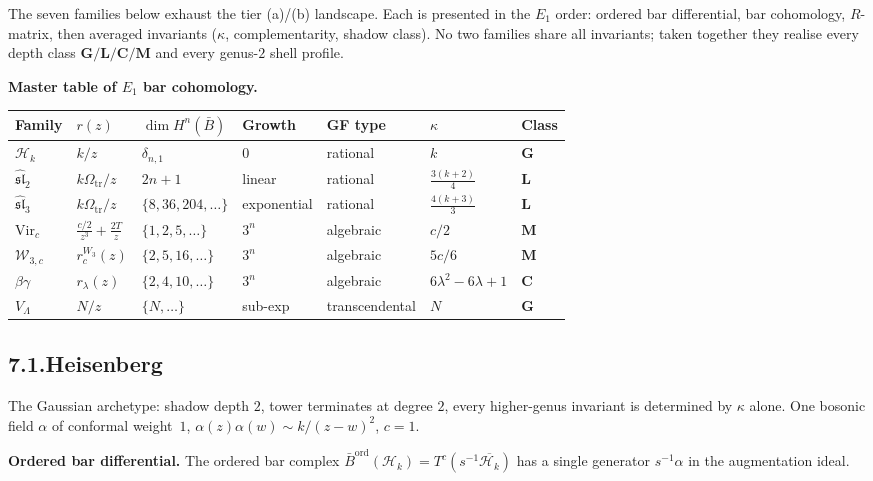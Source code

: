 \documentclass[11pt,reqno]{amsart}
\theoremstyle{definition}
\theoremstyle{remark}
\providecommand{\cH}{\mathcal{H}}
\providecommand{\cW}{\mathcal{W}}
\providecommand{\barB}{\bar{B}}
\providecommand{\Vir}{\mathrm{Vir}}
\numberwithin{equation}{section}
\begin{document}
The seven families below exhaust the tier (a)/(b) landscape.
Each is presented in the $E_1$ order: ordered bar differential,
bar cohomology, $R$-matrix, then averaged invariants
($\kappa$, complementarity, shadow class). No two families share
all invariants; taken together they realise every depth class
$\mathbf G / \mathbf L / \mathbf C / \mathbf M$ and every
genus-$2$ shell profile.

\medskip
\noindent\textbf{Master table of $E_1$ bar cohomology.}\enspace
\begin{center}
\small
\renewcommand{\arraystretch}{1.2}
\begin{tabular}{lllllll}
\textbf{Family} & $r(z)$ & $\dim H^n(\barB)$
 & \textbf{Growth} & \textbf{GF type}
 & $\kappa$ & \textbf{Class}\\ \hline
$\cH_k$ & $k/z$ & $\delta_{n,1}$
 & $0$ & rational & $k$ & $\mathbf G$\\
$\widehat{\mathfrak{sl}}_2$ & $k\Omega_{\mathrm{tr}}/z$ & $2n{+}1$
 & linear & rational & $\frac{3(k{+}2)}{4}$ & $\mathbf L$\\
$\widehat{\mathfrak{sl}}_3$ & $k\Omega_{\mathrm{tr}}/z$ & $\{8,36,204,\ldots\}$
 & exponential & rational & $\frac{4(k{+}3)}{3}$ & $\mathbf L$\\
$\Vir_c$ & $\frac{c/2}{z^3}{+}\frac{2T}{z}$ & $\{1,2,5,\ldots\}$
 & $3^n$ & algebraic & $c/2$ & $\mathbf M$\\
$\cW_{3,c}$ & $r_c^{W_3}(z)$ & $\{2,5,16,\ldots\}$
 & $3^n$ & algebraic & $5c/6$ & $\mathbf M$\\
$\beta\gamma$ & $r_\lambda(z)$ & $\{2,4,10,\ldots\}$
 & $3^n$ & algebraic & $6\lambda^2{-}6\lambda{+}1$ & $\mathbf C$\\
$V_\Lambda$ & $N/z$ & $\{N,\ldots\}$
 & sub-exp & transcendental & $N$ & $\mathbf G$
\end{tabular}
\end{center}

\subsection*{7.1.\quad Heisenberg}

The Gaussian archetype: shadow depth $2$, tower terminates at
degree $2$, every higher-genus invariant is determined by $\kappa$
alone. One bosonic field $\alpha$ of conformal weight~$1$,
$\alpha(z)\alpha(w)\sim k/(z-w)^2$, $c=1$.

\medskip\noindent\textbf{Ordered bar differential.}\enspace
The ordered bar complex
$\barB^{\mathrm{ord}}(\cH_k)=T^c(s^{-1}\overline{\cH_k})$
has a single generator $s^{-1}\alpha$ in the augmentation ideal.
\end{document}
